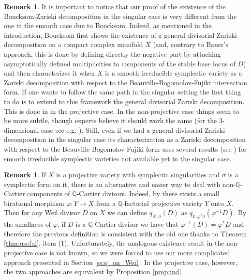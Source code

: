 \documentclass[12pt,reqno]{amsart}
\def\Q{{\mathbb Q}}
\def\phi{\varphi}
\theoremstyle{plain}
\theoremstyle{definition}
\newtheorem{remark}[thm]{Remark}
\begin{document}
\begin{remark}
It is important to notice that our proof of the existence of the Boucksom-Zariski decomposition in the
singular case is very different from the one in the smooth case due to Boucksom. Indeed, as mentioned in the introduction,
Boucksom first shows the existence of a general divisorial Zariski decomposition on a compact complex manifold $X$ (and, contrary to Bauer's approach, this is done by defining directly the negative part by attaching asymptotically defined multiplicities to components of the stable base locus of $D$) and then characterizes it when $X$ is a smooth irreducible symplectic variety as a Zariski decomposition with respect to the Beauville-Bogomolov-Fujiki intersection form. If one wants to follow the same path in the singular setting the first thing to do is to extend to this framework the general divisorial Zariski decomposition. This is done in \cite[Section 4]{BH} in the projective case. In the non-projective case things seem to be more subtle, though experts  believe it should work the same (for the 3-dimensional case see e.g. \cite[Section 4.B]{HPmmp}). Still, even if we had a general divisorial Zariski decomposition in the singular case its characterization as a Zariski decomposition with respect to the Beauville-Bogomolov-Fujiki form uses several results (see \cite[Section 4]{Boucksom1}) for smooth irreducible symplectic varieties not available yet in the singular case. 
\end{remark}
\begin{remark}\label{rmk:proj}
If $X$ is a projective variety with symplectic singularities and $\sigma$ is a symplectic form on it, there is an alternative and easier way to deal with non-$\Q$-Cartier components of $\Q$-Cartier divisors. Indeed, by \cite[Lemma 10.2]{BCHM} there exists a small birational morphism $\phi:Y\to X$ from a $\Q$-factorial projective variety $Y$ onto $X$. Then for any Weil divisor $D$ on $X$ we can define $q_{X,\sigma}(D)$ as $q_{Y,\phi^*\sigma}(\phi^{-1}D)$. By the smallness of $\phi$, if $D$ is a $\Q$-Cartier divisor we have that $\phi^{-1}(D)=\phi^*D$ and therefore the previous definition is consistent with the old one thanks to Theorem \ref{thm:useful}, item (1). 
Unfortunately, the analogous existence result in the non-projective case is not known, so we were forced to use our more complicated approach presented in Section \ref{ss:q_on_Weil}.
In the projective case, however, the two approaches are equivalent by Proposition \ref{prop:ind}.
\end{remark}
\end{document}
